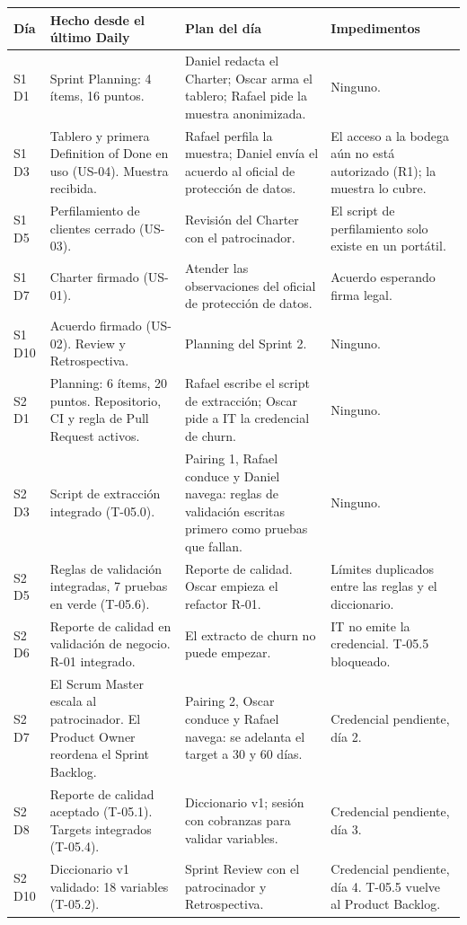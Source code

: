 \documentclass[10pt,a4paper]{article}
\begin{document}
{\footnotesize
\begin{tabularx}{\linewidth}{@{}l L L L@{}}
\toprule
Día & Hecho desde el último Daily & Plan del día & Impedimentos \\
\midrule
S1 D1 & Sprint Planning: 4 ítems, 16 puntos. & Daniel redacta el Charter; Oscar arma el tablero; Rafael pide la muestra anonimizada. & Ninguno. \\
S1 D3 & Tablero y primera Definition of Done en uso (US-04). Muestra recibida. & Rafael perfila la muestra; Daniel envía el acuerdo al oficial de protección de datos. & El acceso a la bodega aún no está autorizado (R1); la muestra lo cubre. \\
S1 D5 & Perfilamiento de clientes cerrado (US-03). & Revisión del Charter con el patrocinador. & El script de perfilamiento solo existe en un portátil. \\
S1 D7 & Charter firmado (US-01). & Atender las observaciones del oficial de protección de datos. & Acuerdo esperando firma legal. \\
S1 D10 & Acuerdo firmado (US-02). Review y Retrospectiva. & Planning del Sprint 2. & Ninguno. \\
\midrule
S2 D1 & Planning: 6 ítems, 20 puntos. Repositorio, CI y regla de Pull Request activos. & Rafael escribe el script de extracción; Oscar pide a IT la credencial de churn. & Ninguno. \\
S2 D3 & Script de extracción integrado (T-05.0). & Pairing 1, Rafael conduce y Daniel navega: reglas de validación escritas primero como pruebas que fallan. & Ninguno. \\
S2 D5 & Reglas de validación integradas, 7 pruebas en verde (T-05.6). & Reporte de calidad. Oscar empieza el refactor R-01. & Límites duplicados entre las reglas y el diccionario. \\
S2 D6 & Reporte de calidad en validación de negocio. R-01 integrado. & El extracto de churn no puede empezar. & \textcolor{alert}{IT no emite la credencial. T-05.5 bloqueado.} \\
S2 D7 & El Scrum Master escala al patrocinador. El Product Owner reordena el Sprint Backlog. & Pairing 2, Oscar conduce y Rafael navega: se adelanta el target a 30 y 60 días. & Credencial pendiente, día 2. \\
S2 D8 & Reporte de calidad aceptado (T-05.1). Targets integrados (T-05.4). & Diccionario v1; sesión con cobranzas para validar variables. & Credencial pendiente, día 3. \\
S2 D10 & Diccionario v1 validado: 18 variables (T-05.2). & Sprint Review con el patrocinador y Retrospectiva. & Credencial pendiente, día 4. T-05.5 vuelve al Product Backlog. \\
\bottomrule
\end{tabularx}}
\end{document}
